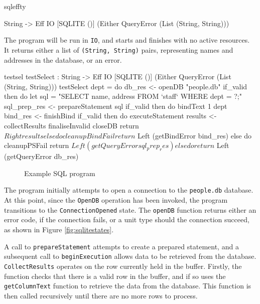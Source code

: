 \noindent
\begin{SaveVerbatim}{sqleffty}

String -> Eff IO [SQLITE ()] 
           (Either QueryError (List (String, String)))

\end{SaveVerbatim}

\noindent
The program will be run in \texttt{IO}, and starts and finishes with no active
resources.  It returns either a list of \texttt{(String, String)} pairs,
representing names and addresses in the database, or an error.

\begin{SaveVerbatim}{testsel}
testSelect : String -> Eff IO [SQLITE ()] 
             (Either QueryError (List (String, String)))
testSelect dept = do
  db_res <- openDB "people.db"
  if_valid then do
    let sql = "SELECT name, address FROM `staff` 
                    WHERE dept = ?;"
    sql_prep_res <- prepareStatement sql
    if_valid then do 
      bindText 1 dept
      bind_res <- finishBind
      if_valid then do
        executeStatement
        results <- collectResults
        finaliseInvalid
        closeDB
        return $ Right results
      else do
        cleanupBindFail
        return $ Left (getBindError bind_res)
    else do
      cleanupPSFail
      return $ Left (getQueryError sql_prep_res)
  else do 
    return $ Left (getQueryError db_res)
\end{SaveVerbatim}

\begin{figure}[h]
\caption{Example SQL program}
\label{fig:testsel}
\end{figure}

The program initially attempts to open a connection to the \texttt{people.db}
database. At this point, since the \texttt{OpenDB} operation has been invoked,
the program transitions to the \texttt{ConnectionOpened} state. The
\texttt{openDB} function returns either an error code, if the connection fails, or a unit type should the connection succeed, as shown in Figure \ref{fig:sqlitestates}.

A call to \texttt{prepareStatement} attempts to create a prepared statement,
and a subsequent call to \texttt{beginExecution} allows data to be retrieved
from the database.
%
\texttt{CollectResults} operates on the row currently held in the buffer.
Firstly, the function checks
that there is a valid row in the buffer, and if so uses the
\texttt{getColumnText} function to retrieve the data
from the database. This function is then called recursively until there are no
more rows to process.

